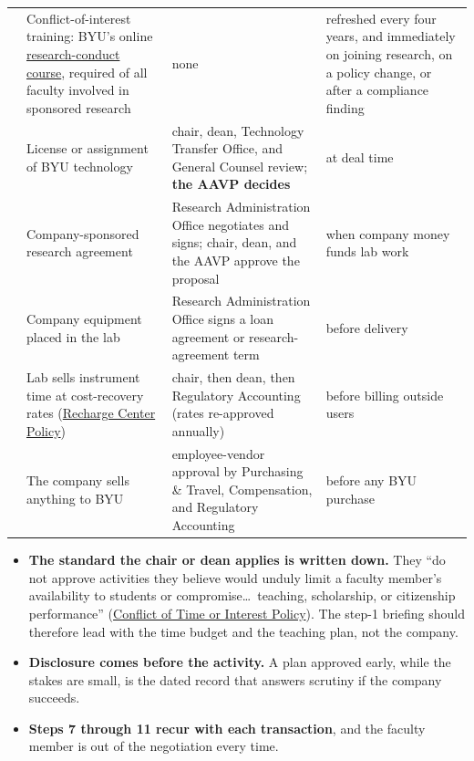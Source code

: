 \documentclass[11pt]{article}
\begin{document}
{\begin{longtable}{@{} >{\bfseries}p{0.22in} >{\RaggedRight\arraybackslash}p{2.75in} >{\RaggedRight\arraybackslash}p{1.95in} >{\RaggedRight\arraybackslash}p{1.15in} @{}}
\addlinespace
6 & Conflict-of-interest training: BYU's online
\href{https://spo.byu.edu/responsible-conduct-of-research}{research-conduct
course}, required of all faculty involved in sponsored research & none &
refreshed every four years, and immediately on joining research, on a policy
change, or after a compliance finding \\
\addlinespace
7 & License or assignment of BYU technology & chair, dean, Technology Transfer
Office, and General Counsel review; \textbf{the AAVP decides} & at deal time \\
\addlinespace
8 & Company-sponsored research agreement & Research Administration Office
negotiates and signs; chair, dean, and the AAVP approve the proposal & when
company money funds lab work \\
\addlinespace
9 & Company equipment placed in the lab & Research Administration Office signs
a loan agreement or research-agreement term & before delivery \\
\addlinespace
10 & Lab sells instrument time at cost-recovery rates
(\href{https://spo.byu.edu/00000190-3687-d777-a591-37af392d0001/rechargecenterpolicyprocedures-pdf}{Recharge
Center Policy}) & chair, then dean, then Regulatory Accounting (rates
re-approved annually) & before billing outside users \\
\addlinespace
11 & The company sells anything to BYU & employee-vendor approval by
Purchasing \& Travel, Compensation, and Regulatory Accounting & before any BYU
purchase \\
\end{longtable}}

\begin{itemize}
\item \textbf{The standard the chair or dean applies is written down.} They
``do not approve activities they believe would unduly limit a faculty member's
availability to students or compromise\ldots\ teaching, scholarship, or
citizenship performance''
(\href{https://policy.byu.edu/view/conflict-of-time-or-interest-policy}{Conflict
of Time or Interest Policy}). The step-1 briefing should therefore lead with
the time budget and the teaching plan, not the company.
\item \textbf{Disclosure comes before the activity.} A plan approved early,
while the stakes are small, is the dated record that answers scrutiny if the
company succeeds.
\item \textbf{Steps 7 through 11 recur with each transaction}, and the faculty
member is out of the negotiation every time.
\end{itemize}
\end{document}
